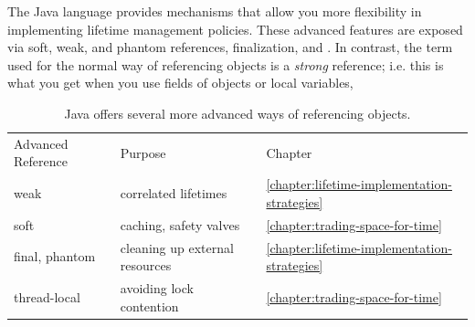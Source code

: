 

The Java language provides mechanisms that allow you more flexibility in
implementing lifetime management policies. These advanced features are exposed
via soft, weak, and phantom references, finalization, and \tls. In contrast, the
term used for the normal way of referencing objects is a \emph{strong}
reference; i.e. this is what you get when you use
fields of objects or local variables,


\begin{table}
\centering
	\begin{tabular}{lll}
	\toprule
	Advanced Reference & Purpose                & Chapter \\
	\cmidrule(r){1-1} \cmidrule(r){2-2} \cmidrule(l){3-3}
    weak           & correlated lifetimes           & \autoref{chapter:lifetime-implementation-strategies}  \\
    soft           & caching, safety valves & \autoref{chapter:trading-space-for-time} \\
    final, phantom & cleaning up external resources & \autoref{chapter:lifetime-implementation-strategies} \\
    thread-local   & avoiding lock contention & \autoref{chapter:trading-space-for-time} \\ 
	\bottomrule
	\end{tabular}
	\caption{Java offers several more advanced ways of referencing objects.}
\end{table}

